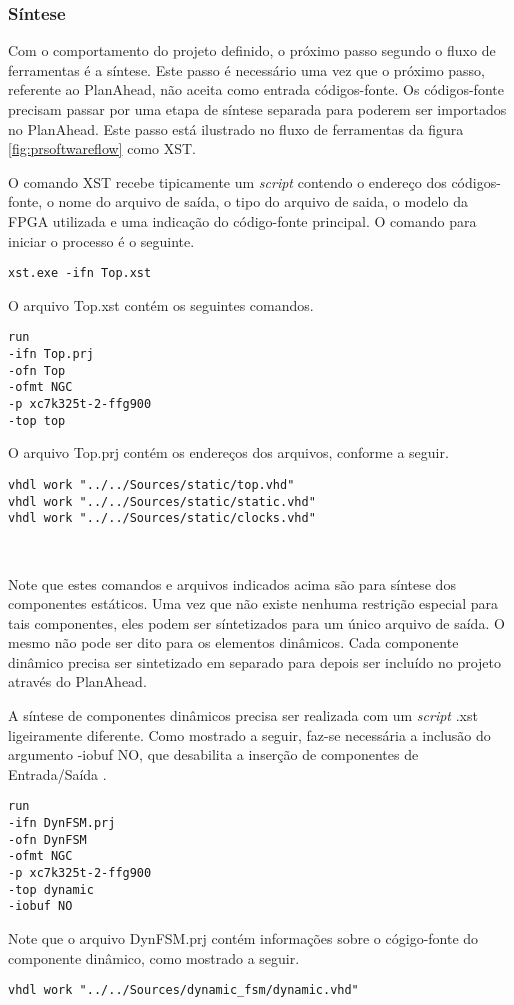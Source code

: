 \documentclass[11pt,a4paper,oneside]{book}
\begin{document}
\subsubsection{Síntese}
Com o comportamento do projeto definido, o próximo passo segundo o fluxo de ferramentas é a síntese.
Este passo é necessário uma vez que o próximo passo, referente ao PlanAhead, não aceita como entrada códigos-fonte.
Os códigos-fonte precisam passar por uma etapa de síntese separada para poderem ser importados no PlanAhead.
Este passo está ilustrado no fluxo de ferramentas da figura \ref{fig:prsoftwareflow} como XST.

O comando XST recebe tipicamente um \textit{script} contendo o endereço dos códigos-fonte, o nome do arquivo de saída, o tipo do arquivo de saida, o modelo da FPGA utilizada e uma indicação do código-fonte principal.
O comando para iniciar o processo é o seguinte.
\begin{lstlisting}[style=customVHDL]
xst.exe -ifn Top.xst
\end{lstlisting}
O arquivo \dlq{}Top.xst\drq{} contém os seguintes comandos.
\begin{lstlisting}[style=customVHDL]
run
-ifn Top.prj
-ofn Top
-ofmt NGC
-p xc7k325t-2-ffg900
-top top
\end{lstlisting}
O arquivo \dlq{}Top.prj\drq{} contém os endereços dos arquivos, conforme a seguir.
\begin{lstlisting}[style=customVHDL]
vhdl work "../../Sources/static/top.vhd"
vhdl work "../../Sources/static/static.vhd"
vhdl work "../../Sources/static/clocks.vhd"
\end{lstlisting}\

Note que estes comandos e arquivos indicados acima são para síntese dos componentes estáticos.
Uma vez que não existe nenhuma restrição especial para tais componentes, eles podem ser síntetizados para um único arquivo de saída.
O mesmo não pode ser dito para os elementos dinâmicos.
Cada componente dinâmico precisa ser sintetizado em separado para depois ser incluído no projeto através do PlanAhead.

A síntese de componentes dinâmicos precisa ser realizada com um \textit{script} \dlq{}.xst\drq{} ligeiramente diferente.
Como mostrado a seguir, faz-se necessária a inclusão do argumento \dlq{}-iobuf NO\drq{}, que desabilita a inserção de componentes de Entrada/Saída \cite{ug743, ug748}.
\begin{lstlisting}[style=customVHDL]
run
-ifn DynFSM.prj
-ofn DynFSM
-ofmt NGC
-p xc7k325t-2-ffg900
-top dynamic
-iobuf NO
\end{lstlisting}
Note que o arquivo \dlq{}DynFSM.prj\drq{} contém informações sobre o cógigo-fonte do componente dinâmico, como mostrado a seguir.
\begin{lstlisting}[style=customVHDL]
vhdl work "../../Sources/dynamic_fsm/dynamic.vhd"
\end{lstlisting}
\end{document}
